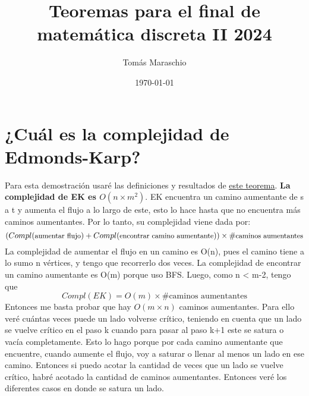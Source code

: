 \documentclass[11pt]{article}
\author{Tomás Maraschio}
\date{\today}
\title{Teoremas para el final de matemática discreta II 2024}
\begin{document}
\maketitle
\setcounter{tocdepth}{1}
\tableofcontents


\section{¿Cuál es la complejidad de Edmonds-Karp?}
\label{sec:orga17b3f5}
Para esta demostración usaré las definiciones y resultados de \hyperref[sec:orga5328ee]{\uline{este teorema}}.
\textbf{La complejidad de EK es \(O(n \times m^2)\)}. EK encuentra un camino aumentante de s a t y aumenta el flujo a lo largo de este, esto lo hace hasta que no encuentra más caminos aumentantes. Por lo tanto, su complejidad viene dada por:
\[(Compl(\text{\small aumentar flujo}) + Compl(\text{\small encontrar camino aumentante})) \times \# \text{\small caminos aumentantes} \]
La complejidad de aumentar el flujo en un camino es O(n), pues el camino tiene a lo sumo n vértices, y tengo que recorrerlo dos veces. La complejidad de encontrar un camino aumentante es O(m) porque uso BFS. Luego, como n < m-2, tengo que
\[Compl(EK) = O(m) \times \# \text{caminos aumentantes} \]
Entonces me basta probar que hay \(O(m \times n)\) caminos aumentantes. Para ello veré cuántas veces puede un lado volverse crítico, teniendo en cuenta que un lado se vuelve crítico en el paso k cuando para pasar al paso k+1 este se satura o vacía completamente. Esto lo hago porque por cada camino aumentante que encuentre, cuando aumente el flujo, voy a saturar o llenar al menos un lado en ese camino. Entonces si puedo acotar la cantidad de veces que un lado se vuelve crítico, habré acotado la cantidad de caminos aumentantes.
Entonces veré los diferentes casos en donde se satura un lado.
\end{document}
